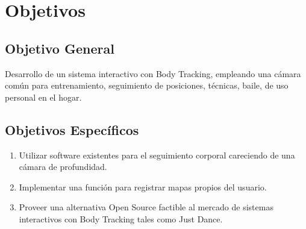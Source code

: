 \chapter{Objetivos}


\section{Objetivo General}

Desarrollo de un sistema interactivo con Body Tracking, empleando una cámara común para entrenamiento,  seguimiento de posiciones, técnicas, baile, de uso personal en el hogar.

\section{Objetivos Específicos}

\begin{enumerate}
	\item Utilizar software existentes para el seguimiento corporal careciendo de una cámara de profundidad.
	\item Implementar una función para registrar mapas propios del usuario.
	\item Proveer una alternativa Open Source factible al mercado de sistemas interactivos con Body Tracking tales como Just Dance.
\end{enumerate}

